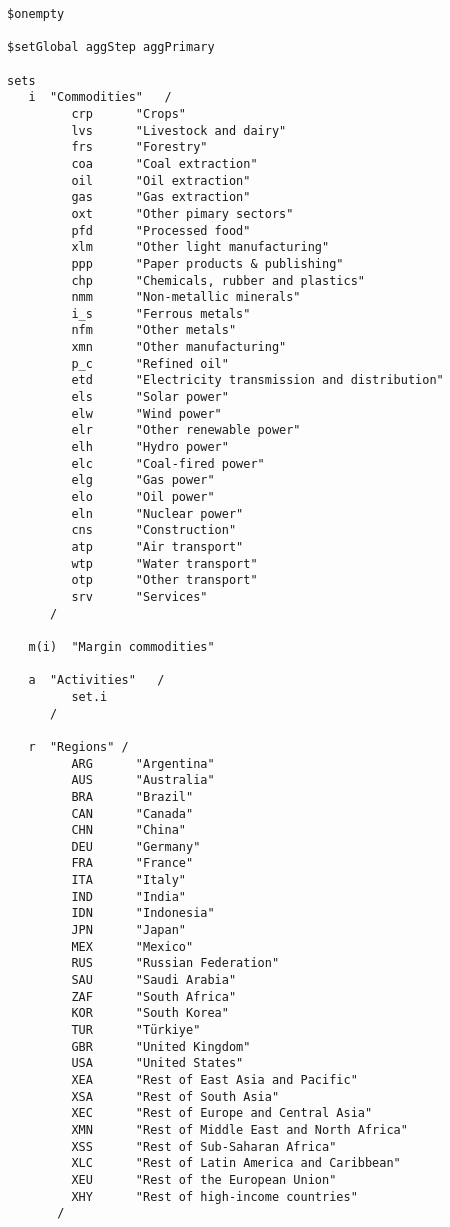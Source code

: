\begin{lstlisting}[language=GAMS, caption={Mapping file for primary aggregation}, label=lst:PrimAgg]
$onempty

$setGlobal aggStep aggPrimary

sets
   i  "Commodities"   /
         crp      "Crops"
         lvs      "Livestock and dairy"
         frs      "Forestry"
         coa      "Coal extraction"
         oil      "Oil extraction"
         gas      "Gas extraction"
         oxt      "Other pimary sectors"
         pfd      "Processed food"
         xlm      "Other light manufacturing"
         ppp      "Paper products & publishing"
         chp      "Chemicals, rubber and plastics"
         nmm      "Non-metallic minerals"
         i_s      "Ferrous metals"
         nfm      "Other metals"
         xmn      "Other manufacturing"
         p_c      "Refined oil"
         etd      "Electricity transmission and distribution"
         els      "Solar power"
         elw      "Wind power"
         elr      "Other renewable power"
         elh      "Hydro power"
         elc      "Coal-fired power"
         elg      "Gas power"
         elo      "Oil power"
         eln      "Nuclear power"
         cns      "Construction"
         atp      "Air transport"
         wtp      "Water transport"
         otp      "Other transport"
         srv      "Services"
      /

   m(i)  "Margin commodities"

   a  "Activities"   /
         set.i
      /

   r  "Regions" /
         ARG      "Argentina"
         AUS      "Australia"
         BRA      "Brazil"
         CAN      "Canada"
         CHN      "China"
         DEU      "Germany"
         FRA      "France"
         ITA      "Italy"
         IND      "India"
         IDN      "Indonesia"
         JPN      "Japan"
         MEX      "Mexico"
         RUS      "Russian Federation"
         SAU      "Saudi Arabia"
         ZAF      "South Africa"
         KOR      "South Korea"
         TUR      "Türkiye"
         GBR      "United Kingdom"
         USA      "United States"
         XEA      "Rest of East Asia and Pacific"
         XSA      "Rest of South Asia"
         XEC      "Rest of Europe and Central Asia"
         XMN      "Rest of Middle East and North Africa"
         XSS      "Rest of Sub-Saharan Africa"
         XLC      "Rest of Latin America and Caribbean"
         XEU      "Rest of the European Union"
         XHY      "Rest of high-income countries"
       /


\end{lstlisting}

